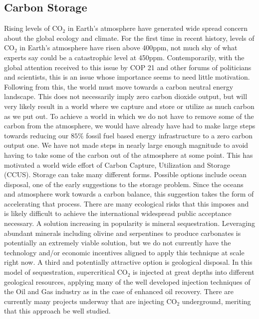 \documentclass[letterpaper, 12pt]{article}
\begin{document}
\subsection{Carbon Storage}
Rising levels of CO$_2$ in Earth's atmosphere have generated wide spread concern about the global ecology and climate. For the first time in recent history, levels of CO$_2$ in Earth's atmosphere have risen above 400ppm, not much shy of what experts say could be a catastrophic level at 450ppm. Contemporarily, with the global attention received to this issue by COP 21 and other forums of politicians and scientists, this is an issue whose importance seems to need little motivation.
Following from this, the world must move towards a carbon neutral energy landscape. This does not necessarily imply zero carbon dioxide output, but will very likely result in a world where we capture and store or utilize as much carbon as we put out. To achieve a world in which we do not have to remove some of the carbon from the atmosphere, we would have already have had to make large steps towards reducing our $85\%$ fossil fuel based energy infrastructure to a zero carbon output one. We have not made steps in nearly large enough magnitude to avoid having to take some of the carbon out of the atmosphere at some point. 
This has motivated a world wide effort of Carbon Capture, Utilization and Storage (CCUS). Storage can take many different forms. Possible options include ocean disposal, one of the early suggestions to the storage problem. Since the oceans and atmosphere work towards a carbon balance, this suggestion takes the form of accelerating that process. There are many ecological risks that this imposes and is likely difficult to achieve the international widespread public acceptance necessary. A solution increasing in popularity is mineral sequestration. Leveraging abundant minerals including olivine and serpentines to produce carbonates is potentially an extremely viable solution, but we do not currently have the technology and/or economic incentives aligned to apply this technique at scale right now. A third and potentially attractive option is geological disposal. In this model of sequestration, supercritical CO$_2$ is injected at great depths into different geological resources, applying many of the well developed injection techniques of the Oil and Gas industry as in the case of enhanced oil recovery. There are currently many projects underway that are injecting CO$_2$ underground, meriting that this approach be well studied. 
\end{document}
